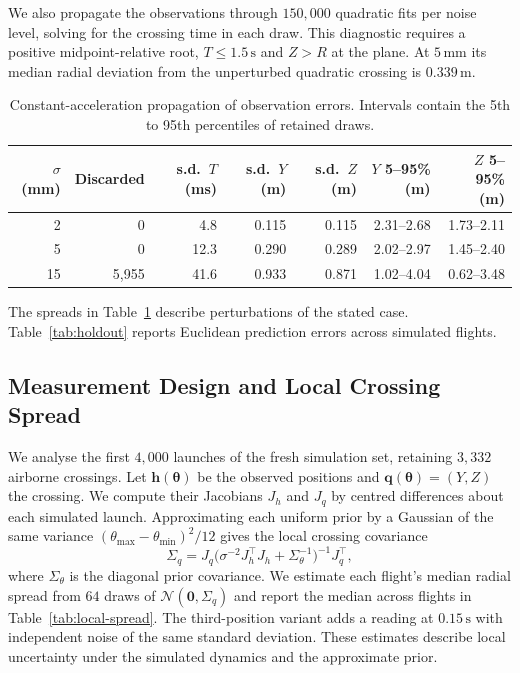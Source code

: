 \documentclass[11pt,a4paper]{article}
\begin{document}
We also propagate the observations through $150{,}000$ quadratic fits per noise level, solving for the crossing time in each draw. This diagnostic requires a positive midpoint-relative root, $T\le1.5\,\mathrm{s}$ and $Z>R$ at the plane. At $5\,\mathrm{mm}$ its median radial deviation from the unperturbed quadratic crossing is $0.339\,\mathrm{m}$.

\begin{table}[htbp]
  \centering
  \small
  \caption{Constant-acceleration propagation of observation errors. Intervals contain the 5th to 95th percentiles of retained draws.}
  \label{tab:noise}
  \begin{tabular}{rrrrrrr}
    \toprule
    $\sigma$ (mm) & Discarded & s.d.\ $T$ (ms) & s.d.\ $Y$ (m) & s.d.\ $Z$ (m) & $Y$ 5--95\% (m) & $Z$ 5--95\% (m) \\
    \midrule
    2  & 0     & 4.8  & 0.115 & 0.115 & 2.31--2.68 & 1.73--2.11 \\
    5  & 0     & 12.3 & 0.290 & 0.289 & 2.02--2.97 & 1.45--2.40 \\
    15 & 5{,}955 & 41.6 & 0.933 & 0.871 & 1.02--4.04 & 0.62--3.48 \\
    \bottomrule
  \end{tabular}
\end{table}

The spreads in Table~\ref{tab:noise} describe perturbations of the stated case. Table~\ref{tab:holdout} reports Euclidean prediction errors across simulated flights.

\clearpage
\subsection{Measurement Design and Local Crossing Spread}
\label{app:design}

We analyse the first $4{,}000$ launches of the fresh simulation set, retaining $3{,}332$ airborne crossings. Let $\mathbf h(\boldsymbol\theta)$ be the observed positions and $\mathbf q(\boldsymbol\theta)=(Y,Z)$ the crossing. We compute their Jacobians $J_h$ and $J_q$ by centred differences about each simulated launch. Approximating each uniform prior by a Gaussian of the same variance $(\theta_{\max}-\theta_{\min})^2/12$ gives the local crossing covariance
\begin{equation}
  \Sigma_q=J_q
  \bigl(\sigma^{-2}J_h^\top J_h+\Sigma_\theta^{-1}\bigr)^{-1}
  J_q^\top ,
  \label{eq:local-cov}
\end{equation}
where $\Sigma_\theta$ is the diagonal prior covariance. We estimate each flight's median radial spread from $64$ draws of $\mathcal N(\mathbf 0,\Sigma_q)$ and report the median across flights in Table~\ref{tab:local-spread}. The third-position variant adds a reading at $0.15\,\mathrm{s}$ with independent noise of the same standard deviation. These estimates describe local uncertainty under the simulated dynamics and the approximate prior.
\end{document}
